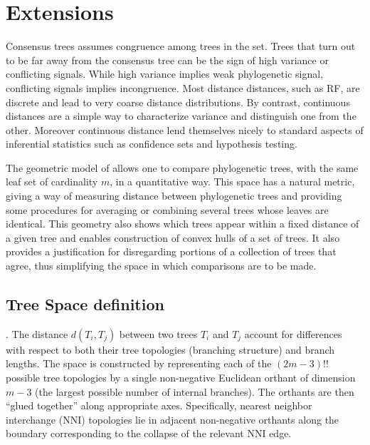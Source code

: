 \section{Extensions} \label{sec:extensions}

Consensus trees assumes congruence among trees in the set. Trees that turn out to be far away from the consensus tree can be the sign of high variance or conflicting signals. While high variance implies weak phylogenetic signal, conflicting  signals implies incongruence. Most distance distances, such as RF, are discrete and lead to very coarse distance distributions. By contrast, continuous distances are a simple way to characterize variance and distinguish one from the other. Moreover continuous distance lend themselves nicely to standard aspects of inferential statistics such as confidence sets and hypothesis testing. 


The  geometric  model of \cite{Billera2001} allows one to compare phylogenetic  trees,  with  the  same  leaf  set  of  cardinality $m$, in a quantitative way.  This  space  has  a  natural  metric, giving a way of measuring distance between phylogenetic trees and providing some procedures for averaging or combining several trees whose leaves are identical. This geometry also shows which trees appear within a fixed distance of a given tree and enables construction of convex hulls of a
set of trees. It also provides a justification for disregarding portions of a collection of trees that agree,  thus simplifying the space in which comparisons are to be made.

\subsection{Tree Space definition} \label{sec:Tree-distances}
 . The distance $d(T_i,T_j)$ between two trees $T_i$ and $T_j$ account for differences with respect to both their tree topologies (branching structure) and branch lengths. The space is constructed by representing each of the $(2m-3)!!$ possible tree topologies by a single non-negative Euclidean orthant of dimension $m-3$ (the largest possible number of internal branches). The orthants are then “glued together” along appropriate axes. Specifically, nearest neighbor interchange (NNI) topologies lie in adjacent non-negative orthants along the boundary corresponding to the collapse of the relevant NNI edge.

